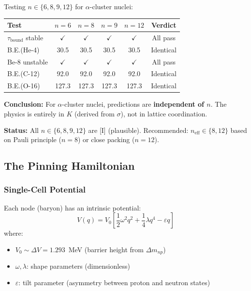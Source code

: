 \begin{tcolorbox}[colback=green!5!white, colframe=green!75!black, title=Critical Result: Model Independence of $n$ {[Cal]}]
Testing $n \in \{6, 8, 9, 12\}$ for $\alpha$-cluster nuclei:

\begin{center}
\begin{tabular}{lccccc}
\hline
Test & $n=6$ & $n=8$ & $n=9$ & $n=12$ & Verdict \\
\hline
$\tau_{\text{bound}}$ stable & $\checkmark$ & $\checkmark$ & $\checkmark$ & $\checkmark$ & All pass \\
B.E.(He-4) & 30.5 & 30.5 & 30.5 & 30.5 & Identical \\
Be-8 unstable & $\checkmark$ & $\checkmark$ & $\checkmark$ & $\checkmark$ & All pass \\
B.E.(C-12) & 92.0 & 92.0 & 92.0 & 92.0 & Identical \\
B.E.(O-16) & 127.3 & 127.3 & 127.3 & 127.3 & Identical \\
\hline
\end{tabular}
\end{center}

\textbf{Conclusion:} For $\alpha$-cluster nuclei, predictions are \textbf{independent of $n$}. The physics is entirely in $K$ (derived from $\sigma$), not in lattice coordination.
\end{tcolorbox}

\textbf{Status:} All $n \in \{6, 8, 9, 12\}$ are [I] (plausible). Recommended: $n_{\text{eff}} \in \{8, 12\}$ based on Pauli principle ($n=8$) or close packing ($n=12$).

\subsection{The Pinning Hamiltonian}
\label{subsec:m6-hamiltonian}

\subsubsection{Single-Cell Potential}

Each node (baryon) has an intrinsic potential:
\begin{equation}
    V(q) = V_0 \left[ \frac{1}{2}\omega^2 q^2 + \frac{1}{4}\lambda q^4 - \varepsilon q \right]
    \label{eq:m6-single-potential}
\end{equation}
where:
\begin{itemize}
    \item $V_0 \sim \Delta V = 1.293$~MeV (barrier height from $\Delta m_{np}$)
    \item $\omega, \lambda$: shape parameters (dimensionless)
    \item $\varepsilon$: tilt parameter (asymmetry between proton and neutron states)
\end{itemize}

